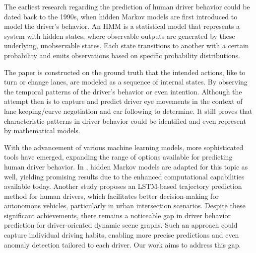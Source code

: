 The earliest research regarding the prediction of human driver behavior could be dated back to the 1990s, when hidden Markov models are first introduced to model the driver's behavior\cite{10.1162/089976699300016890}. An HMM is a statistical model that represents a system with hidden states, where observable outputs are generated by these underlying, unobservable states. Each state transitions to another with a certain probability and emits observations based on specific probability distributions. 

The paper is constructed on the ground truth that the intended actions, like to turn or change lanes, are modeled as a sequence of internal states. By observing the temporal patterns of the driver's behavior or even intention. Although the attempt then is to capture and predict driver eye movements in the context of lane keeping/curve negotiation and car following to determine. It still proves that characteristic patterns in driver behavior could be identified and even represent by mathematical models.

With the advancement of various machine learning models, more sophisticated tools have emerged, expanding the range of options available for predicting human driver behavior. In \cite{10.1109/ivs.2018.8500717}, hidden Markov models are adapted for this topic as well, yielding promising results due to the enhanced computational capabilities available today. Another study \cite{10.1109/icra40945.2020.9196918} proposes an LSTM-based trajectory prediction method for human drivers, which facilitates better decision-making for autonomous vehicles, particularly in urban intersection scenarios. Despite these significant achievements, there remains a noticeable gap in driver behavior prediction for driver-oriented dynamic scene graphs. Such an approach could capture individual driving habits, enabling more precise predictions and even anomaly detection tailored to each driver. Our work aims to address this gap.